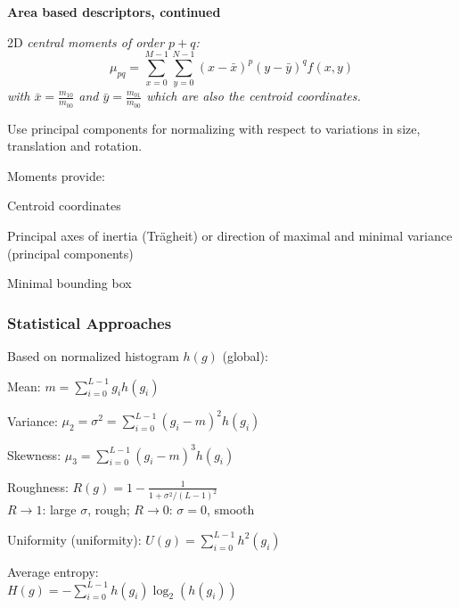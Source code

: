   \begin{minipage}{9cm}
    \textbf{Area based descriptors, continued}
    
      2D \em central \em moments of order $p+q$: $$\mu_{pq} = \sum_{x=0}^{M-1} \sum_{y=0}^{N-1} (x-\bar{x})^p (y-\bar{y})^q f(x,y)$$
      with $\bar{x}=\frac{m_{10}}{m_{00}}$ and $\bar{y}=\frac{m_{01}}{m_{00}}$ which are also the
      centroid coordinates.
      
      Use principal components for normalizing with respect to variations in size, translation and 
      rotation.
      
      Moments provide:
      \begin{compactList}
        \item Centroid coordinates
        \item Principal axes of inertia (Trägheit) or direction of maximal and minimal 
          variance (principal components)
        \item Minimal bounding box
      \end{compactList}
    
      \subsubsection{Statistical Approaches}
        Based on normalized histogram $h(g)$ (global):\\ 
        \begin{compactList}
          \item Mean: $m=\sum_{i=0}^{L-1} g_i h(g_i)$
          \item Variance: $\mu_2 = \sigma^2 = \sum_{i=0}^{L-1} (g_i-m)^2 h(g_i)$
          \item Skewness: $\mu_3 = \sum_{i=0}^{L-1} (g_i-m)^3 h(g_i)$
          \item Roughness: $R(g) = 1 - \frac{1}{1 + \sigma^2/(L-1)^2}$\\
            $R \rightarrow 1$: large $\sigma$, rough; $R \rightarrow 0$: $\sigma = 0$, smooth
          \item Uniformity (uniformity): $U(g) = \sum_{i=0}^{L-1} h^2(g_i)$
          \item Average entropy: \\$H(g) = -\sum_{i=0}^{L-1} h(g_i) \log_2(h(g_i))$
        \end{compactList}
      

\end{minipage}
